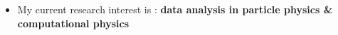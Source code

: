 \documentclass[11pt,aspectratio=169]{beamer}
\begin{document}
\begin{frame}{\underline{\secname}}
\begin{itemize}




	\end{itemize}

	\begin{itemize}			  
	\item My current research interest is :\textbf{ data analysis in particle physics \& computational physics }
	
\end{itemize}
\end{frame}

%
%	
%	
%			
%		
%			
%	

%
\end{document}
